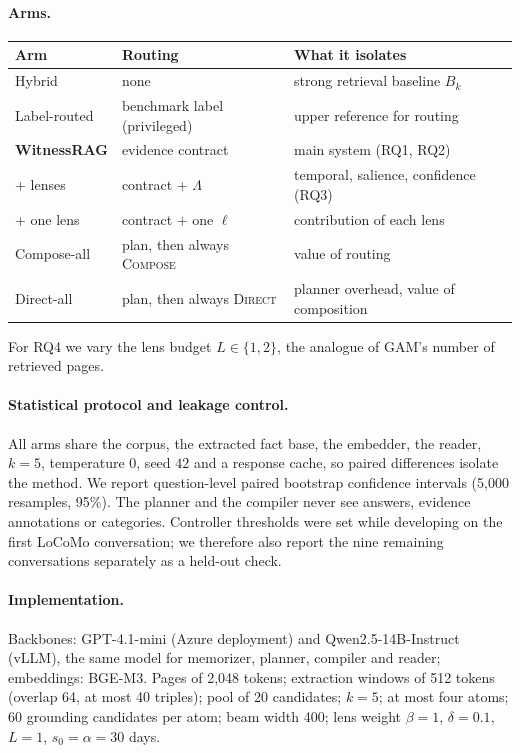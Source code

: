\paragraph{Arms.}
\begin{center}
\small
\begin{tabular}{@{}lll@{}}
\toprule
Arm & Routing & What it isolates \\
\midrule
Hybrid & none & strong retrieval baseline $B_k$ \\
Label-routed & benchmark label (privileged) & upper reference for routing \\
\textbf{WitnessRAG} & evidence contract & main system (RQ1, RQ2) \\
\quad + lenses & contract + $\Lambda$ & temporal, salience, confidence (RQ3) \\
\quad + one lens & contract + one $\ell$ & contribution of each lens \\
Compose-all & plan, then always \textsc{Compose} & value of routing \\
Direct-all & plan, then always \textsc{Direct} & planner overhead, value of composition \\
\bottomrule
\end{tabular}
\end{center}
For RQ4 we vary the lens budget $L\in\{1,2\}$, the analogue of GAM's number of
retrieved pages.

\paragraph{Statistical protocol and leakage control.}
All arms share the corpus, the extracted fact base, the embedder, the reader,
$k=5$, temperature $0$, seed $42$ and a response cache, so paired differences
isolate the method. We report question-level paired bootstrap confidence
intervals (5{,}000 resamples, 95\%). The planner and the compiler never see
answers, evidence annotations or categories. Controller thresholds were set
while developing on the first LoCoMo conversation; we therefore also report
the nine remaining conversations separately as a held-out check.

\paragraph{Implementation.}
Backbones: GPT-4.1-mini (Azure deployment) and Qwen2.5-14B-Instruct (vLLM),
the same model for memorizer, planner, compiler and reader; embeddings:
BGE-M3. Pages of 2{,}048 tokens; extraction windows of 512 tokens (overlap 64,
at most 40 triples); pool of 20 candidates; $k=5$; at most four atoms; 60
grounding candidates per atom; beam width 400; lens weight $\beta=1$,
$\delta=0.1$, $L=1$, $s_0=\alpha=30$ days.
